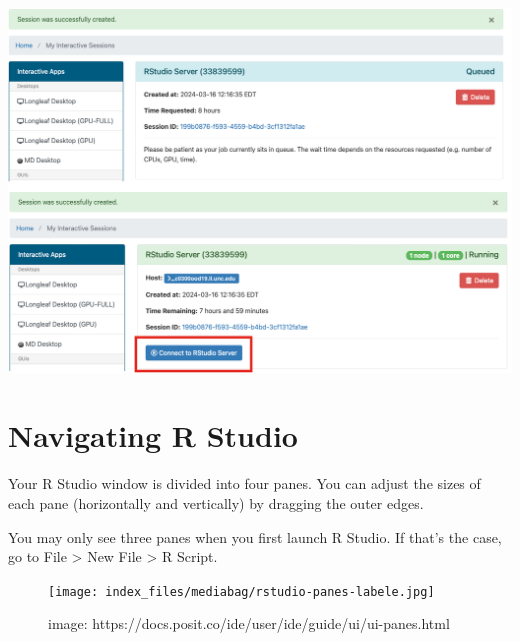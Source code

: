 \documentclass[
  letterpaper,
  DIV=11,
  numbers=noendperiod]{scrreprt}
\begin{document}
\begin{center}
\includegraphics{scripts/00_intro/class0_images/Picture3.png}
\end{center}

\section{Navigating R Studio}\label{navigating-r-studio}

Your R Studio window is divided into four panes. You can adjust the
sizes of each pane (horizontally and vertically) by dragging the outer
edges.

\begin{tcolorbox}[enhanced jigsaw, bottomtitle=1mm, bottomrule=.15mm, toprule=.15mm, opacityback=0, leftrule=.75mm, breakable, colback=white, toptitle=1mm, left=2mm, coltitle=black, titlerule=0mm, opacitybacktitle=0.6, title=\textcolor{quarto-callout-note-color}{\faInfo}\hspace{0.5em}{Note}, rightrule=.15mm, arc=.35mm, colframe=quarto-callout-note-color-frame, colbacktitle=quarto-callout-note-color!10!white]

You may only see three panes when you first launch R Studio. If that's
the case, go to File \textgreater{} New File \textgreater{} R Script.

\end{tcolorbox}

\begin{figure}[H]

{\centering \texttt{[image: index\_files/mediabag/rstudio-panes-labele.jpg]}

}

\caption{image:
https://docs.posit.co/ide/user/ide/guide/ui/ui-panes.html}

\end{figure}%
\end{document}
